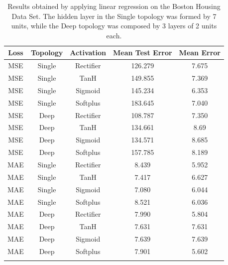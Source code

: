 \documentclass[10pt,journal,A4paper,compsoc,epsfig]{IEEEtran}
\begin{document}
\begin{table}
\centering
\begin{tabular}{c c c c c}
Loss & Topology & Activation & Mean Test Error & Mean Error \\ 
\hline 
\noalign{\medskip}
MSE & Single & Rectifier & 126.279 & 7.675 \\ \noalign{\smallskip}
MSE & Single & TanH & 149.855 & 7.369 \\ \noalign{\smallskip}
MSE & Single & Sigmoid & 145.234 & 6.353 \\ \noalign{\smallskip}
MSE & Single & Softplus & 183.645 & 7.040 \\ \noalign{\smallskip}
MSE & Deep & Rectifier & 108.787 & 7.350 \\ \noalign{\smallskip}
MSE & Deep & TanH & 134.661 & 8.69 \\ \noalign{\smallskip}
MSE & Deep & Sigmoid & 134.571 & 8.685 \\ \noalign{\smallskip}
MSE & Deep & Softplus & 157.785 & 8.189 \\ \noalign{\smallskip}
MAE & Single & Rectifier & 8.439 & 5.952 \\ \noalign{\smallskip}
MAE & Single & TanH & 7.417 & 6.627 \\ \noalign{\smallskip}
MAE & Single & Sigmoid & 7.080 & 6.044 \\ \noalign{\smallskip}
MAE & Single & Softplus & 8.521 & 6.036 \\ \noalign{\smallskip}
MAE & Deep & Rectifier & 7.990 & 5.804 \\ \noalign{\smallskip}
MAE & Deep & TanH & 7.631 & 7.631 \\ \noalign{\smallskip}
MAE & Deep & Sigmoid & 7.639 & 7.639 \\ \noalign{\smallskip}
MAE & Deep & Softplus & 7.901 & 5.602 \\ \noalign{\smallskip}
\hline \noalign{\medskip}
\end{tabular}
\caption{Results obtained by applying linear regression on the Boston Housing Data Set. The hidden layer in the Single topology was formed by 7 units, while the Deep topology was composed by 3 layers of 2 units each.}
\label{table_results_housing}
\end{table}%
\end{document}

